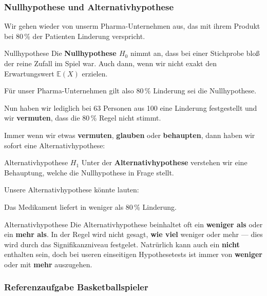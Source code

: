 
\subsubsection{Nullhypothese und Alternativhypothese}

Wir gehen wieder von unserm Pharma-Unternehmen aus, das mit ihrem
Produkt bei 80\,\% der Patienten Linderung verspricht.


\begin{definition}{Nullhypothese}{}
Die \textbf{Nullhypothese $H_0$} nimmt an, dass bei einer Stichprobe
bloß der reine Zufall im Spiel war. Auch dann, wenn wir nicht exakt
den Erwartungswert $\mathbb{E}(X)$ erzielen.
\end{definition}

Für unser Pharma-Unternehmen gilt also 80\,\% Linderung sei die
Nullhypothese.


Nun haben wir lediglich bei 63 Personen aus 100 eine Linderung festgestellt und wir \textbf{vermuten}, dass die 80\,\% Regel nicht stimmt.

Immer wenn wir etwas \textbf{vermuten}, \textbf{glauben} oder \textbf{behaupten}, dann haben wir sofort eine Alternativhypothese:


\begin{definition}{Alternativhypothese $H_1$}{}
Unter der \textbf{Alternativhypothese} verstehen wir eine Behauptung, welche die Nullhypothese in Frage stellt.
\end{definition}

Unsere Alternativhypothese könnte lauten:

\begin{center}Das Medikament liefert in weniger als 80\,\% Linderung.\end{center}

\begin{bemerkung}{Alternativhypothese}{}
  Die Alternativhypothese beinhaltet oft ein \textbf{weniger als} oder ein \textbf{mehr als}. In der Regel wird nicht gesagt, \textbf{wie viel} weniger oder mehr --- dies wird durch das Signifikanzniveau festgelet. Natrürlich kann auch ein \textbf{nicht} enthalten sein, doch bei useren einseitigen Hypothesetests ist immer von \textbf{weniger} oder mit \textbf{mehr} auszugehen.
\end{bemerkung}

\newpage

\subsubsection*{Referenzaufgabe Basketballspieler}

